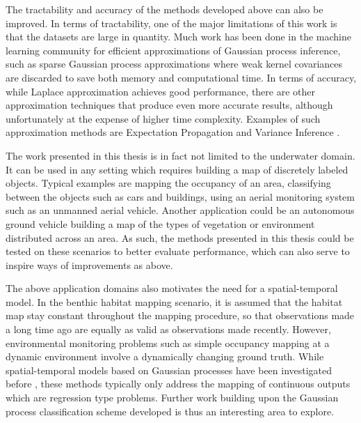 	The tractability and accuracy of the methods developed above can also be improved. In terms of tractability, one of the major limitations of this work is that the datasets are large in quantity. Much work has been done in the machine learning community for efficient approximations of Gaussian process inference, such as sparse Gaussian process approximations where weak kernel covariances are discarded to save both memory and computational time. In terms of accuracy, while Laplace approximation achieves good performance, there are other approximation techniques that produce even more accurate results, although unfortunately at the expense of higher time complexity. Examples of such approximation methods are Expectation Propagation and Variance Inference \cite{GaussianProcessForMachineLearning}.
	
	The work presented in this thesis is in fact not limited to the underwater domain. It can be used in any setting which requires building a map of discretely labeled objects. Typical examples are mapping the occupancy of an area, classifying between the objects such as cars and buildings, using an aerial monitoring system such as an unmanned aerial vehicle. Another application could be an autonomous ground vehicle building a map of the types of vegetation or environment distributed across an area. As such, the methods presented in this thesis could be tested on these scenarios to better evaluate performance, which can also serve to inspire ways of improvements as above.
	
	The above application domains also motivates the need for a spatial-temporal model. In the benthic habitat mapping scenario, it is assumed that the habitat map stay constant throughout the mapping procedure, so that observations made a long time ago are equally as valid as observations made recently. However, environmental monitoring problems such as simple occupancy mapping at a dynamic environment involve a dynamically changing ground truth. While spatial-temporal models based on Gaussian processes have been investigated before \cite{Roman:SequentialBayesianOptimisation}, these methods typically only address the mapping of continuous outputs which are regression type problems. Further work building upon the Gaussian process classification scheme developed is thus an interesting area to explore.
	
	
	
%	
%	
%	
%	
%	
	

	